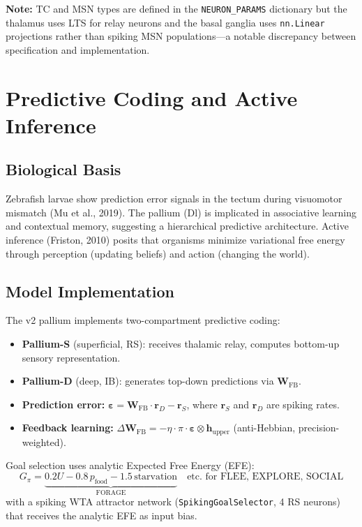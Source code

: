 \documentclass[11pt,a4paper]{article}
\begin{document}
\noindent\textbf{Note:} TC and MSN types are defined in the \texttt{NEURON\_PARAMS}
dictionary but the thalamus uses LTS for relay neurons and the basal ganglia uses
\texttt{nn.Linear} projections rather than spiking MSN populations---a notable
discrepancy between specification and implementation.

\section{Predictive Coding and Active Inference}
\label{sec:predcoding}

\subsection{Biological Basis}

Zebrafish larvae show prediction error signals in the tectum during visuomotor
mismatch (Mu et al., 2019).  The pallium (Dl) is implicated in associative learning
and contextual memory, suggesting a hierarchical predictive architecture.
Active inference (Friston, 2010) posits that organisms minimize variational free energy
through perception (updating beliefs) and action (changing the world).

\subsection{Model Implementation}

The v2 pallium implements two-compartment predictive coding:
\begin{itemize}[leftmargin=*]
\item \textbf{Pallium-S} (superficial, RS): receives thalamic relay, computes
  bottom-up sensory representation.
\item \textbf{Pallium-D} (deep, IB): generates top-down predictions via
  $\mathbf{W}_\text{FB}$.
\item \textbf{Prediction error:}
  $\boldsymbol{\varepsilon} = \mathbf{W}_\text{FB} \cdot \mathbf{r}_D - \mathbf{r}_S$,
  where $\mathbf{r}_S$ and $\mathbf{r}_D$ are spiking rates.
\item \textbf{Feedback learning:}
  $\Delta\mathbf{W}_\text{FB} = -\eta \cdot \pi \cdot \boldsymbol{\varepsilon} \otimes \mathbf{h}_\text{upper}$
  (anti-Hebbian, precision-weighted).
\end{itemize}

Goal selection uses analytic Expected Free Energy (EFE):
\begin{equation}
G_\pi = \underbrace{0.2U - 0.8\,p_\text{food} - 1.5\,\text{starvation}}_\text{FORAGE}
\quad\text{etc.\ for FLEE, EXPLORE, SOCIAL}
\end{equation}
with a spiking WTA attractor network (\texttt{SpikingGoalSelector}, 4 RS neurons)
that receives the analytic EFE as input bias.
\end{document}
